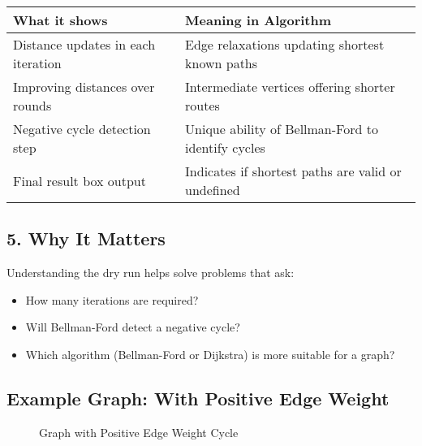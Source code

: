 \documentclass[14pt,a4paper]{extarticle}
\begin{document}
\begin{table}[H]
\centering
\renewcommand{\arraystretch}{1.3}
\begin{tabular}{|p{5cm}|p{8cm}|}
\hline
\textbf{What it shows} & \textbf{Meaning in Algorithm} \\
\hline
Distance updates in each iteration & Edge relaxations updating shortest known paths \\
\hline
Improving distances over rounds & Intermediate vertices offering shorter routes \\
\hline
Negative cycle detection step & Unique ability of Bellman-Ford to identify cycles \\
\hline
Final result box output & Indicates if shortest paths are valid or undefined \\
\hline
\end{tabular}
\end{table}

\newpage
\subsection*{5. Why It Matters}

Understanding the dry run helps solve problems that ask:
\begin{itemize}
    \item How many iterations are required?
    \item Will Bellman-Ford detect a negative cycle?
    \item Which algorithm (Bellman-Ford or Dijkstra) is more suitable for a graph?
\end{itemize}


\subsection{Example Graph: With Positive Edge Weight}
\begin{figure}[H]
\centering
{}
\caption{Graph with Positive Edge Weight Cycle}
\end{figure}
\end{document}
